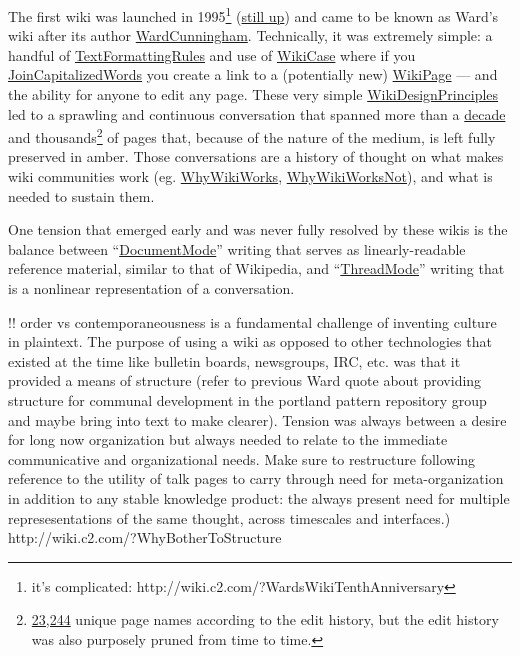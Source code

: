 \documentclass[10pt]{tufte-book}
\begin{document}
The first wiki was launched in 1995\footnote{it's complicated:
  http://wiki.c2.com/?WardsWikiTenthAnniversary}
(\href{http://wiki.c2.com/}{still up}) and came to be known as Ward's
wiki after its author
\href{http://wiki.c2.com/?WardCunningham}{WardCunningham}. Technically,
it was extremely simple: a handful of
\href{http://wiki.c2.com/?TextFormattingRules}{TextFormattingRules} and
use of \href{http://wiki.c2.com/?WikiCase}{WikiCase} where if you
\href{http://wiki.c2.com/?JoinCapitalizedWords}{JoinCapitalizedWords}
you create a link to a (potentially new)
\href{http://wiki.c2.com/?WikiPage}{WikiPage} --- and the ability for
anyone to edit any page. These very simple
\href{http://wiki.c2.com/?WikiDesignPrinciples}{WikiDesignPrinciples}
led to a sprawling and continuous conversation that spanned more than a
\href{http://wiki.c2.com/?WardsWikiTenthAnniversary}{decade} and
thousands\footnote{\href{http://c2.com/wiki/history/}{23,244} unique
  page names according to the edit history, but the edit history was
  also purposely pruned from time to time.} of pages that, because of
the nature of the medium, is left fully preserved in amber. Those
conversations are a history of thought on what makes wiki communities
work (eg. \href{http://wiki.c2.com/?WhyWikiWorks}{WhyWikiWorks},
\href{http://wiki.c2.com/?WhyWikiWorksNot}{WhyWikiWorksNot}), and what
is needed to sustain them.

One tension that emerged early and was never fully resolved by these
wikis is the balance between
``\href{http://wiki.c2.com/?DocumentMode}{DocumentMode}'' writing that
serves as linearly-readable reference material, similar to that of
Wikipedia, and ``\href{http://wiki.c2.com/?ThreadMode}{ThreadMode}''
writing that is a nonlinear representation of a conversation.

!! order vs contemporaneousness is a fundamental challenge of inventing
culture in plaintext. The purpose of using a wiki as opposed to other
technologies that existed at the time like bulletin boards, newsgroups,
IRC, etc. was that it provided a means of structure (refer to previous
Ward quote about providing structure for communal development in the
portland pattern repository group and maybe bring into text to make
clearer). Tension was always between a desire for long now organization
but always needed to relate to the immediate communicative and
organizational needs. Make sure to restructure following reference to
the utility of talk pages to carry through need for meta-organization in
addition to any stable knowledge product: the always present need for
multiple represesentations of the same thought, across timescales and
interfaces.) http://wiki.c2.com/?WhyBotherToStructure
\end{document}
